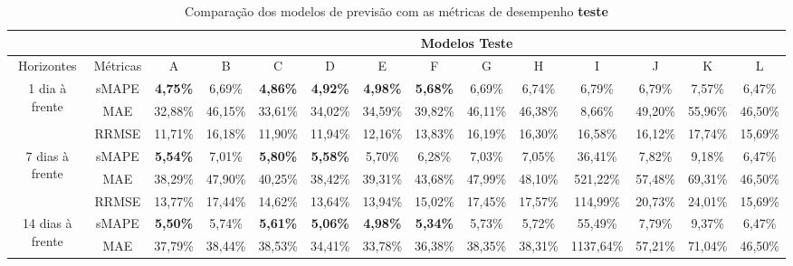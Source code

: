 \begin{landscape}
\begin{table}[!htpb]
	\centering
	\caption{Comparação dos modelos de previsão com as métricas de desempenho \textbf{teste}}\label{tb:apd-tst}
\begin{tabular}{@{}cccccccccccccc@{}}
	\toprule
	&          & \multicolumn{12}{c}{Modelos Teste}                                                                                                                              \\ \midrule
	Horizontes                        & Métricas & A               & B       & C               & D               & E               & F               & G       & H       & I         & J       & K       & L       \\ \midrule
	\multirow{3}{*}{1 dia à frente}   & sMAPE    & \textbf{4,75\%} & 6,69\%  & \textbf{4,86\%} & \textbf{4,92\%} & \textbf{4,98\%} & \textbf{5,68\%} & 6,69\%  & 6,74\%  & 6,79\%    & 6,79\%  & 7,57\%  & 6,47\%  \\
	& MAE      & 32,88\%         & 46,15\% & 33,61\%         & 34,02\%         & 34,59\%         & 39,82\%         & 46,11\% & 46,38\% & 8,66\%    & 49,20\% & 55,96\% & 46,50\% \\
	& RRMSE    & 11,71\%         & 16,18\% & 11,90\%         & 11,94\%         & 12,16\%         & 13,83\%         & 16,19\% & 16,30\% & 16,58\%   & 16,12\% & 17,74\% & 15,69\% \\ \midrule
	\multirow{3}{*}{7 dias à frente}  & sMAPE    & \textbf{5,54\%} & 7,01\%  & \textbf{5,80\%} & \textbf{5,58\%} & 5,70\%          & 6,28\%          & 7,03\%  & 7,05\%  & 36,41\%   & 7,82\%  & 9,18\%  & 6,47\%  \\
	& MAE      & 38,29\%         & 47,90\% & 40,25\%         & 38,42\%         & 39,31\%         & 43,68\%         & 47,99\% & 48,10\% & 521,22\%  & 57,48\% & 69,31\% & 46,50\% \\
	& RRMSE    & 13,77\%         & 17,44\% & 14,62\%         & 13,64\%         & 13,94\%         & 15,02\%         & 17,45\% & 17,57\% & 114,99\%  & 20,73\% & 24,01\% & 15,69\% \\ \midrule
	\multirow{3}{*}{14 dias à frente} & sMAPE    & \textbf{5,50\%} & 5,74\%  & \textbf{5,61\%} & \textbf{5,06\%} & \textbf{4,98\%} & \textbf{5,34\%} & 5,73\%  & 5,72\%  & 55,49\%   & 7,79\%  & 9,37\%  & 6,47\%  \\
	& MAE      & 37,79\%         & 38,44\% & 38,53\%         & 34,41\%         & 33,78\%         & 36,38\%         & 38,35\% & 38,31\% & 1137,64\% & 57,21\% & 71,04\% & 46,50\% \\

\end{tabular}
\end{table}
\end{landscape}
